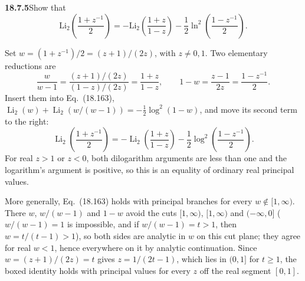 \par\bigskip
\noindent\textbf{18.7.5}\quad Show that
\[
\mathrm{Li}_{2}\left(\frac{1+z^{-1}}{2}\right)
=-\mathrm{Li}_{2}\left(\frac{1+z}{1-z}\right)
-\frac{1}{2}\ln^{2}\left(\frac{1-z^{-1}}{2}\right).
\]
\par\nobreak
\solution
Set $w=(1+z^{-1})/2=(z+1)/(2z)$, with $z\ne0,1$.
Two elementary reductions are
\[
\frac{w}{w-1}
 =\frac{(z+1)/(2z)}{(1-z)/(2z)}=\frac{1+z}{1-z},
\qquad
1-w=\frac{z-1}{2z}=\frac{1-z^{-1}}2.
\]
Insert them into Eq.~(18.163),
$\operatorname{Li}_2(w)+\operatorname{Li}_2(w/(w-1))
=-\tfrac12\log^2(1-w)$, and move its second term to the
right:
\[
\boxed{\operatorname{Li}_2\!\left(\frac{1+z^{-1}}2\right)
=-\operatorname{Li}_2\!\left(\frac{1+z}{1-z}\right)
-\frac12\log^2\!\left(\frac{1-z^{-1}}2\right)}.
\]
For real $z>1$ or $z<0$, both dilogarithm arguments are less
than one and the logarithm's argument is positive, so this is
an equality of ordinary real principal values.

More generally, Eq.~(18.163) holds with principal branches for
every $w\notin[1,\infty)$.  There $w$, $w/(w-1)$ and $1-w$ avoid
the cuts $[1,\infty)$, $[1,\infty)$ and $(-\infty,0]$
($w/(w-1)=1$ is impossible, and if $w/(w-1)=t>1$, then
$w=t/(t-1)>1$), so both sides are analytic
in $w$ on this cut plane; they agree for real $w<1$, hence
everywhere on it by analytic continuation.  Since
$w=(z+1)/(2z)=t$ gives $z=1/(2t-1)$, which lies in $(0,1]$ for
$t\ge1$, the boxed identity holds with principal values for every
$z$ off the real segment $[0,1]$.

